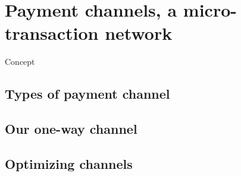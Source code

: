 \chapter{Payment channels, a micro-transaction network}
\label{chap:payment-channels}

Concept
\lipsum[1-2]

\minitoc

\newpage

\section{Types of payment channel}

\lipsum[1-2]

\section{Our one-way channel}

\lipsum[1-2]

\section{Optimizing channels}

\lipsum[1-2]
